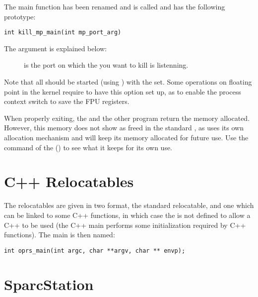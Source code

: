 The  main function has been renamed and is called
 and has the following prototype:

\begin{verbatim}
int kill_mp_main(int mp_port_arg)
\end{verbatim}

The argument is explained below:

\begin{description}

\item[] is the port on which the \MPA{} you want
to kill is listenning.

\end{description}

Note that all \CPK{} should be started (using ) with the
 set. Some operations on floating point in the kernel require
to have this option set up, as to enable the process context switch to save the
FPU registers.

When properly exiting, the \CPK{} and the other \COPRSDE{} program return the
memory allocated. However, this memory does not show as freed in the standard
, as \CPK{} uses its own allocation mechanism and will keep its
memory allocated for future use. Use the  command of the
\CPK{} () to see what it keeps for
its own use. 


\section{C++ Relocatables}

The relocatables are given in two format, the standard relocatable, and one
which can be linked to some C++ functions, in which case the  is not
defined to allow a C++  to be used (the C++ main performs some
initialization required by C++ functions). The main is then named:

\begin{verbatim}
int oprs_main(int argc, char **argv, char ** envp);
\end{verbatim}

\section{SparcStation}

